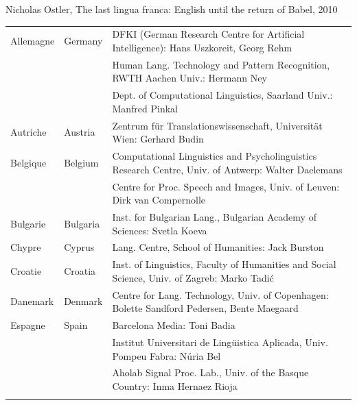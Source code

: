 \documentclass[]{../metanetpaper}
\begin{document}
Nicholas Ostler, The last lingua franca: English until the return of Babel, 2010\\



%

  
\cleardoublepage

\label{metanetmembers}

\small
\begin{longtable}{llp{105mm}}
  Allemagne & \textcolor{grey1}{Germany} & DFKI (German Research Centre for Artificial Intelligence): Hans Uszkoreit, Georg Rehm\\ \addlinespace
  & & Human Lang. Technology and Pattern Recognition, RWTH Aachen Univ.: Hermann Ney \\ \addlinespace
  & & Dept. of Computational Linguistics, Saarland Univ.: Manfred Pinkal\\ \addlinespace 
  Autriche & \textcolor{grey1}{Austria} & Zentrum für Translationswissenschaft, Universität Wien: Gerhard Budin\\ \addlinespace 
  Belgique & \textcolor{grey1}{Belgium} & Computational Linguistics and Psycholinguistics Research Centre, Univ. of Antwerp: Walter Daelemans\\ \addlinespace
  & & Centre for Proc. Speech and Images, Univ. of Leuven: Dirk van Compernolle \\ \addlinespace
  Bulgarie & \textcolor{grey1}{Bulgaria} & Inst. for Bulgarian Lang., Bulgarian Academy of Sciences: Svetla Koeva \\ \addlinespace
  Chypre & \textcolor{grey1}{Cyprus} & Lang. Centre, School of Humanities: Jack Burston\\ \addlinespace
  Croatie & \textcolor{grey1}{Croatia} & Inst. of Linguistics, Faculty of Humanities and Social Science, Univ. of Zagreb: Marko Tadić \\ \addlinespace
  Danemark &  \textcolor{grey1}{Denmark} & Centre for Lang. Technology, Univ. of Copenhagen: Bolette Sandford Pedersen, Bente Maegaard\\ \addlinespace
  Espagne & \textcolor{grey1}{Spain} & Barcelona Media: Toni Badia \\ \addlinespace 
  & & Institut Universitari de Lingüistica Aplicada, Univ. Pompeu Fabra: Núria Bel \\ \addlinespace 
  & & Aholab Signal Proc. Lab., Univ. of the Basque Country: Inma Hernaez Rioja \\ \addlinespace 

\end{longtable}
\end{document}
